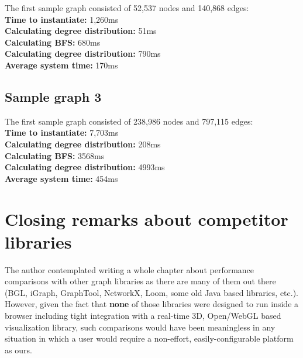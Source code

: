 	The first sample graph consisted of 52,537 nodes and 140,868 edges:\\
	\textbf{Time to instantiate:} 1,260ms\\
	\textbf{Calculating degree distribution:} 51ms\\
	\textbf{Calculating BFS:} 680ms\\
	\textbf{Calculating degree distribution:} 790ms\\
	\textbf{Average system time:} 170ms
	
	\subsection{Sample graph 3}
	\label{ssect:sample_graph_3}
	
	The first sample graph consisted of 238,986 nodes and 797,115 edges:\\
	\textbf{Time to instantiate:} 7,703ms\\
	\textbf{Calculating degree distribution:} 208ms\\
	\textbf{Calculating BFS:} 3568ms\\
	\textbf{Calculating degree distribution:} 4993ms\\
	\textbf{Average system time:} 454ms\\


\section{Closing remarks about competitor libraries}
\label{sect:remarks_competitors}

The author contemplated writing a whole chapter about performance comparisons with other graph libraries as there are many of them out there (BGL, iGraph, GraphTool, NetworkX, Loom, some old Java based libraries, etc.). However, given the fact that \textbf{none} of those libraries were designed to run inside a browser including tight integration with a real-time 3D, Open/WebGL based visualization library, such comparisons would have been meaningless in any situation in which a user would require a non-effort, easily-configurable platform as ours.

